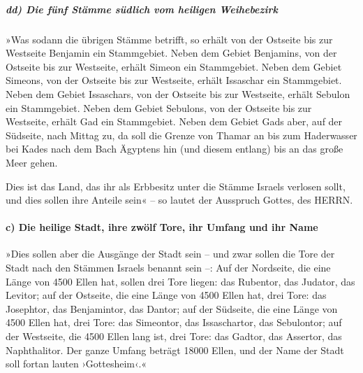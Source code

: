 \hypertarget{dd-die-fuxfcnf-stuxe4mme-suxfcdlich-vom-heiligen-weihebezirk}{%
\subparagraph{dd) Die fünf Stämme südlich vom heiligen
Weihebezirk}\label{dd-die-fuxfcnf-stuxe4mme-suxfcdlich-vom-heiligen-weihebezirk}}

»Was sodann die übrigen Stämme betrifft, so erhält von
der Ostseite bis zur Westseite Benjamin ein Stammgebiet.
Neben dem Gebiet Benjamins, von der Ostseite bis zur
Westseite, erhält Simeon ein Stammgebiet. Neben dem
Gebiet Simeons, von der Ostseite bis zur Westseite, erhält Issaschar ein
Stammgebiet. Neben dem Gebiet Issaschars, von der
Ostseite bis zur Westseite, erhält Sebulon ein Stammgebiet.
Neben dem Gebiet Sebulons, von der Ostseite bis zur
Westseite, erhält Gad ein Stammgebiet. Neben dem Gebiet
Gads aber, auf der Südseite, nach Mittag zu, da soll die Grenze von
Thamar an bis zum Haderwasser bei Kades nach dem Bach Ägyptens hin (und
diesem entlang) bis an das große Meer gehen.

Dies ist das Land, das ihr als Erbbesitz unter die Stämme
Israels verlosen sollt, und dies sollen ihre Anteile sein« -- so lautet
der Ausspruch Gottes, des HERRN.

\hypertarget{c-die-heilige-stadt-ihre-zwuxf6lf-tore-ihr-umfang-und-ihr-name}{%
\paragraph{c) Die heilige Stadt, ihre zwölf Tore, ihr Umfang und ihr
Name}\label{c-die-heilige-stadt-ihre-zwuxf6lf-tore-ihr-umfang-und-ihr-name}}

»Dies sollen aber die Ausgänge der Stadt sein -- und zwar
sollen die Tore der Stadt nach den Stämmen Israels benannt sein --:
Auf der Nordseite, die eine Länge von 4500 Ellen hat,
sollen drei Tore liegen: das Rubentor, das Judator, das Levitor;
auf der Ostseite, die eine Länge von 4500 Ellen hat, drei
Tore: das Josephtor, das Benjamintor, das Dantor; auf der
Südseite, die eine Länge von 4500 Ellen hat, drei Tore: das Simeontor,
das Issaschartor, das Sebulontor; auf der Westseite, die
4500 Ellen lang ist, drei Tore: das Gadtor, das Assertor, das
Naphthalitor. Der ganze Umfang beträgt 18000 Ellen, und
der Name der Stadt soll fortan lauten ›Gottesheim‹.«
